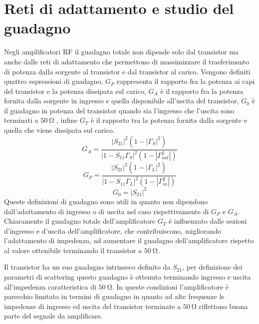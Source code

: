 \documentclass[12pt,oneside]{book}
\begin{document}
\section{Reti di adattamento e studio del guadagno}
Negli amplificatori RF il guadagno totale non dipende solo dal transistor ma anche dalle reti di adattamento che permettono di massimizzare il trasferimento di potenza dalla sorgente al transistor e dal transistor al carico.
Vengono definiti quattro espressioni di guadagno, $G_P$ rappresenta il rapporto fra la potenza ai capi del transistor e la potenza dissipata sul carico,
$G_A$ è il rapporto fra la potenza fornita dalla sorgente in ingresso e quella disponibile all'uscita del transistor, $G_0$ è il guadagno in potenza del transistor quando sia l'ingresso che l'uscita sono terminati a $\SI{50}{\ohm}$ , infine $G_T$ è il rapporto tra la potenza fornita dalla sorgente e quella che viene dissipata sul carico.
\begin{equation}
    G_A = \dfrac{\left|S_{21}\right|^2\left(1-\left|\Gamma_{S}\right|^2\right)}{\left|1-S_{11}\Gamma_{S}\right|^2\left(1-\left|\Gamma_{out}^2\right|\right)}
    \label{av_gain}
\end{equation}
\begin{equation}
    G_P = \dfrac{\left|S_{21}\right|^2\left(1-\left|\Gamma_{L}\right|^2\right)}{\left|1-S_{11}\Gamma_{L}\right|^2\left(1-\left|\Gamma_{in}^2\right|\right)}
    \label{op_gain}
\end{equation}
\begin{equation}
    G_0 = \left|S_{21}\right|^2
\end{equation}
Queste definizioni di guadagno sono utili in quanto non dipendono dall'adattamento di ingresso o di uscita nel caso rispettivamente di $G_P$ e $G_A$. Chiaramente il guadagno totale dell'amplificatore $G_T$ è influenzato dalle sezioni d'ingresso e d'uscita dell'amplificatore, che contribuiscono, migliorando l'adattamento di impedenza, ad aumentare il guadagno dell'amplificatore rispetto al valore ottenibile terminando il transistor a $\SI{50}{\ohm}$.

Il transistor ha un suo guadagno intrinseco definito da $S_{21}$, per definizione dei parametri di scattering questo guadagno è ottenuto terminando ingresso e uscita all'impedenza caratteristica di $\SI{50}{\ohm}$. In queste condizioni l'amplificatore è parecchio limitato in termini di guadagno in quanto ad alte frequenze le impedenze di ingresso ed uscita del transistor terminate a $\SI{50}{\ohm}$ riflettono buona parte del segnale da amplificare.
\end{document}
